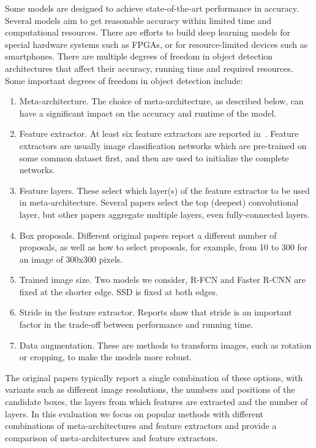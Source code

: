 \documentclass[conference]{IEEEtran}
\begin{document}
Some models are designed to achieve state-of-the-art performance in accuracy. 
Several models aim to get reasonable accuracy within limited time and computational resources. 
There are efforts to build deep learning models for special hardware systems such as FPGAs, or for resource-limited devices such as smartphones. 
There are multiple degrees of freedom in object detection architectures that affect their accuracy, running time and required resources.   Some important degrees of freedom in object detection include:

\begin{enumerate}
     \item Meta-architecture.  The choice of meta-architecture, as described below, can have a significant impact on the accuracy and runtime of the model.  
    \item Feature extractor.   At least six feature extractors are reported in~\cite{huang2017speed}. Feature extractors are usually image classification networks which are pre-trained on some common dataset first, and then are used to initialize the complete networks.  
    \item Feature layers.  These select which layer(s) of the feature extractor to be used in meta-architecture. Several papers select the top (deepest) convolutional layer, but other papers aggregate multiple layers, even fully-connected layers.
    \item Box proposals.  Different original papers report a different number of proposals, as well as how to select proposals, for example, from 10 to 300 for an image of 300x300 pixels.
    \item Trained image size.  Two models we consider, R-FCN and Faster R-CNN are fixed at the shorter edge. SSD is fixed at both edges.
    \item Stride in the feature extractor.  Reports show that stride is an important factor in the trade-off between performance and running time.
    \item Data augmentation.  These are methods to transform images, such as rotation or cropping,  to make the models more robust.
\end{enumerate}

The original papers typically report a single combination of these options, with variants such as different image resolutions, the numbers and positions of the candidate boxes, the layers from which features are extracted and the number of layers.  In this evaluation we focus on popular methods with different combinations of  meta-architectures and feature extractors and provide a comparison of meta-architectures and feature extractors.
\end{document}
